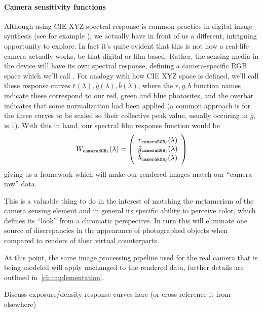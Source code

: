 \paragraph{Camera sensitivity functions}
Although using \gls{CIE} \gls{XYZ} spectral response is common practice
in digital image synthesis (see for example \cite{pharr2023, jakob2022mitsuba3,
ward1994}), we actually have in front of us a different, intriguing opportunity
to explore. 
In fact it's quite evident that this is not how a real-life camera actually works,
be that digital or film-based. 
Rather, the sensing media in the device will have its own spectral response,
defining a camera-specific \gls{RGB} space which we'll call \camRGBl.
For analogy with how \gls{CIE} \gls{XYZ} space is defined, we'll call these
response curves $\bar r(\lambda), \bar g(\lambda), \bar b(\lambda)$, where the 
$r,g,b$ function names indicate these correspond to our red, green and blue photosites, and
the overbar indicates that some normalization had been applied (a common approach is for the 
three curves to be scaled so their collective peak value, usually occuring in $\bar g$, is $1$).
With this in hand, our spectral film response function would be
\begin{equation}
	W_{\texttt{cameraRGB}_\ell}(\lambda) = 
	\left(
	\begin{array}{c}
		\bar r_{\texttt{cameraRGB}_\ell}(\lambda) \\
		\bar g_{\texttt{cameraRGB}_\ell}(\lambda) \\
		\bar b_{\texttt{cameraRGB}_\ell}(\lambda)
	\end{array}
	\right)
\end{equation}
giving us a framework which will make our rendered images match our ``camera raw'' 
data.

This is a valuable thing to do in the interest of matching the metamerism of the 
camera sensing element and in general its specific ability to perceive color, 
which defines its ``look'' from a chromatic perspective. 
In turn this will eliminate one source of discrepancies in the appearance of 
photographed objects when compared to renders of their virtual counterparts.

At this point, the same image processing pipeline used for the real camera
that is being modeled will apply unchanged to the rendered data, further 
details are outlined in~\cref{ch:implementation}.

\begin{inconstruction}
	Discuss exposure/density response curves here
	(or cross-reference it from elsewhere)
\end{inconstruction}


